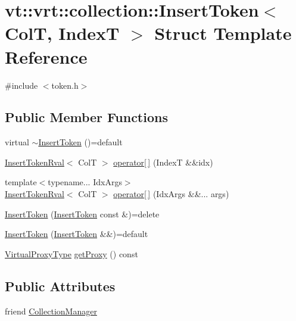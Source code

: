 \hypertarget{structvt_1_1vrt_1_1collection_1_1_insert_token}{}\section{vt\+:\+:vrt\+:\+:collection\+:\+:Insert\+Token$<$ ColT, IndexT $>$ Struct Template Reference}
\label{structvt_1_1vrt_1_1collection_1_1_insert_token}


{\ttfamily \#include $<$token.\+h$>$}

\subsection*{Public Member Functions}
\begin{DoxyCompactItemize}
\item 
virtual \hyperlink{structvt_1_1vrt_1_1collection_1_1_insert_token_a387506c3e013a275665e644d99b75577}{$\sim$\+Insert\+Token} ()=default
\item 
\hyperlink{structvt_1_1vrt_1_1collection_1_1_insert_token_rval}{Insert\+Token\+Rval}$<$ ColT $>$ \hyperlink{structvt_1_1vrt_1_1collection_1_1_insert_token_a1c811d4801cb1a4acde384d19bead046}{operator\mbox{[}$\,$\mbox{]}} (IndexT \&\&idx)
\item 
{\footnotesize template$<$typename... Idx\+Args$>$ }\\\hyperlink{structvt_1_1vrt_1_1collection_1_1_insert_token_rval}{Insert\+Token\+Rval}$<$ ColT $>$ \hyperlink{structvt_1_1vrt_1_1collection_1_1_insert_token_a9021d105041cb56111f8961c88d1ca49}{operator\mbox{[}$\,$\mbox{]}} (Idx\+Args \&\&... args)
\item 
\hyperlink{structvt_1_1vrt_1_1collection_1_1_insert_token_a4adbc8942df683af9d99216c7d2a40d1}{Insert\+Token} (\hyperlink{structvt_1_1vrt_1_1collection_1_1_insert_token}{Insert\+Token} const \&)=delete
\item 
\hyperlink{structvt_1_1vrt_1_1collection_1_1_insert_token_a69f1ea2a33fab61d960c39da57fc0486}{Insert\+Token} (\hyperlink{structvt_1_1vrt_1_1collection_1_1_insert_token}{Insert\+Token} \&\&)=default
\item 
\hyperlink{namespacevt_a1b417dd5d684f045bb58a0ede70045ac}{Virtual\+Proxy\+Type} \hyperlink{structvt_1_1vrt_1_1collection_1_1_insert_token_a41b45da02fd476f5a5a1a57f69f7b17e}{get\+Proxy} () const
\end{DoxyCompactItemize}
\subsection*{Public Attributes}
\begin{DoxyCompactItemize}
\item 
friend \hyperlink{structvt_1_1vrt_1_1collection_1_1_insert_token_a42b6dc06fe8e840dd6ad6c9254b937c3}{Collection\+Manager}
\end{DoxyCompactItemize}


